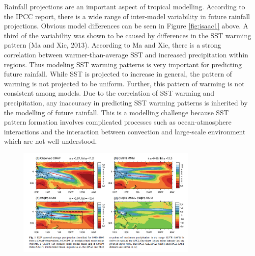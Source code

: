Rainfall projections are an important aspect of tropical modelling.  According to the IPCC report, there is a wide range of inter-model variability in future rainfall projections.  Obvious model differences can be seen in Figure \ref{fig:isaac1} above.  A third of the variability was shown to be caused by differences in the SST warming pattern (Ma and Xie, 2013).  According to Ma and Xie, there is a strong correlation between warmer-than-average SST and increased precipitation within regions.  Thus modeling SST warming patterns is very important for predicting future rainfall.  While SST is projected to increase in general, the pattern of warming is not projected to be uniform.  Further, this pattern of warming is not consistent among models.  Due to the correlation of SST warming and precipitation, any inaccuracy in predicting SST warming patterns is inherited by the modelling of future rainfall.  This is a modelling challenge because SST pattern formation involves complicated processes such as ocean-atmosphere interactions and the interaction between convection and large-scale environment which are not well-understood.\\


\begin{figure}[h!]
\begin{center}
  \includegraphics[width=0.790\textwidth]{isaac-fig2.png}
  \label{fig:isaac2}
\end{center}
\end{figure}


